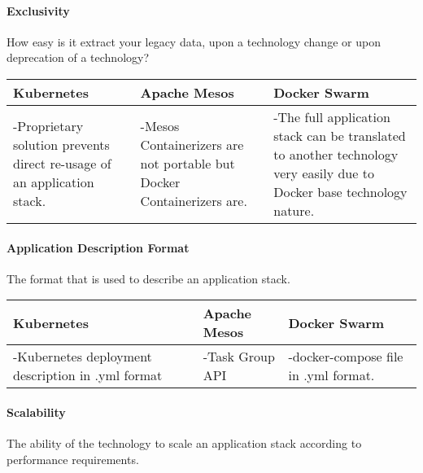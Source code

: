 \paragraph{Exclusivity}

How easy is it extract your legacy data, upon a technology change or upon
deprecation of a technology?

\begin{center}
  \begin{tabular}{ | p{4.5cm} | p{4.5cm} | p{4.5cm} | }
    \hline
    \textbf{Kubernetes}&\textbf{Apache Mesos}&\textbf{Docker Swarm}\\\hline
    -Proprietary solution prevents direct re-usage of an application stack. & 
    
    -Mesos Containerizers are not portable but Docker Containerizers are. &
    
    -The full application stack can be translated to another technology very
    easily due to Docker base technology nature.\\
    \hline
  \end{tabular}
\end{center}

\paragraph{Application Description Format}

The format that is used to describe an application stack.

\begin{center}
  \begin{tabular}{ | p{4.5cm} | p{4.5cm} | p{4.5cm} | }
    \hline
    \textbf{Kubernetes}&\textbf{Apache Mesos}&\textbf{Docker Swarm}\\\hline
    -Kubernetes deployment description in .yml format & 
    
    -Task Group API & 
    
    -docker-compose file in .yml format. \\
    \hline
  \end{tabular}
\end{center}

\paragraph{Scalability}

The ability of the technology to scale an application stack according to
performance requirements.

